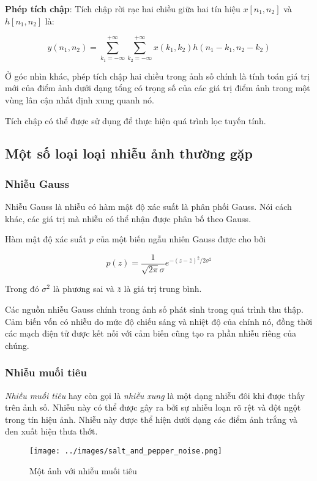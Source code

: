 \textbf{Phép tích chập}: Tích chập rời rạc hai chiều giữa hai tín hiệu $x[n_1, n_2]$ và $h[n_1, n_2]$ là: 

$$y(n_1,n_2) = \sum_{k_1 = -\infty}^{+\infty} \sum_{k_2 = -\infty}^{+\infty} x(k_1,k_2) h(n_1-k_1, n_2-k_2)$$

Ở góc nhìn khác, phép tích chập hai chiều trong ảnh số chính là tính toán giá trị mới của điểm ảnh dưới dạng tổng có trọng số của các giá trị điểm ảnh trong một vùng lân cận nhất định xung quanh nó.

Tích chập có thể được sử dụng để thực hiện quá trình lọc tuyến tính.

\subsection{Một số loại loại nhiễu ảnh thường gặp}

\subsubsection{Nhiễu Gauss}

Nhiễu Gauss là nhiễu có hàm mật độ xác suất là phân phối Gauss. Nói cách khác, các giá trị mà nhiễu có thể nhận được phân bố theo Gauss.

Hàm mật độ xác suất $p$ của một biến ngẫu nhiên Gauss được cho bởi

$$p(z) = \frac{1}{\sqrt{2\pi} \sigma}e^{-(z-\bar{z})^2 / 2\sigma^2}$$

Trong đó $\sigma^2$ là phương sai và $\bar{z}$ là giá trị trung bình.

Các nguồn nhiễu Gauss chính trong ảnh số phát sinh trong quá trình thu thập. Cảm biến vốn có nhiễu do mức độ chiếu sáng và nhiệt độ của chính nó, đồng thời các mạch điện tử được kết nối với cảm biến cũng tạo ra phần nhiễu riêng của chúng.

\subsubsection{Nhiễu muối tiêu}

\textit{Nhiễu muối tiêu} hay còn gọi là \textit{nhiễu xung} là một dạng nhiễu đôi khi được thấy trên ảnh số. Nhiễu này có thể được gây ra bởi sự nhiễu loạn rõ rệt và đột ngột trong tín hiệu ảnh. Nhiễu này được thể hiện dưới dạng các điểm ảnh trắng và đen xuất hiện thưa thớt.

\begin{figure}[H]
    \centering
    \texttt{[image: ../images/salt\_and\_pepper\_noise.png]}
    \caption{Một ảnh với nhiễu muối tiêu}
    \label{fig:salt_and_pepper_noise}
\end{figure}

